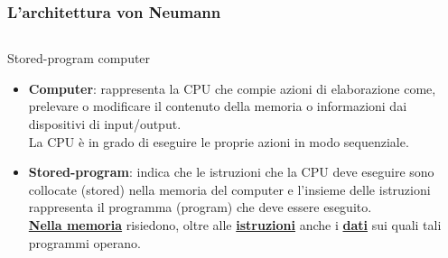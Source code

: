 \begin{frame}
	\frametitle{L'architettura von Neumann}
	
	
	\begin{columns}			
		\begin{block}{Stored-program computer}
			\begin{itemize}
				\item \textbf{Computer}: 
					rappresenta la CPU che compie azioni di elaborazione come, prelevare o modificare il contenuto della memoria o informazioni dai dispositivi di input/output.\\
					La CPU è in grado di eseguire le proprie azioni in modo sequenziale.
				\item \textbf{Stored-program}: indica che le istruzioni che la CPU deve eseguire sono collocate (stored) nella memoria del computer e l'insieme delle istruzioni rappresenta il programma (program) che deve essere eseguito.\\
					\underline{\textbf{Nella memoria}} risiedono, oltre alle \underline{\textbf{istruzioni}} anche i \underline{\textbf{dati}} sui quali tali programmi operano.
			\end{itemize}
		\end{block}
		

\end{columns}
\end{frame}
